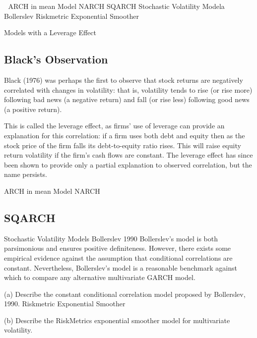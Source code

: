 

ARCH in mean Model
NARCH
SQARCH
Stochastic Volatility Modela
Bollerslev
Riskmetric Exponential Smoother

Models with a Leverage Effect

\subsection*{Black's Observation}
Black (1976) was perhaps the ﬁrst to observe that stock returns are negatively correlated with changes in volatility: that is, volatility tends to rise (or rise more) following bad news (a negative return) and fall (or rise less) following good news (a positive return). 

This is called the leverage eﬀect, as ﬁrms’ use of leverage can provide an explanation for this correlation: if a ﬁrm uses both debt and equity then as the stock price of the ﬁrm falls its debt-to-equity ratio rises. This will raise equity return volatility if the ﬁrm’s cash ﬂows are constant. The leverage eﬀect has since been shown to provide only a partial explanation to observed correlation, but the name persists.


ARCH in mean Model
NARCH

\subsection*{SQARCH}

Stochastic Volatility Models
Bollerslev 1990
Bollerslev’s model is both parsimonious and ensures positive deﬁniteness. However, there exists some empirical evidence against the assumption that conditional correlations are constant.
Nevertheless, Bollerslev’s model is a reasonable benchmark against which to compare any alternative multivariate GARCH model.

(a) Describe the constant conditional correlation model proposed by Bollerslev, 1990.
Riskmetric Exponential Smoother

(b) Describe the RiskMetrics exponential smoother model for multivariate volatility.
